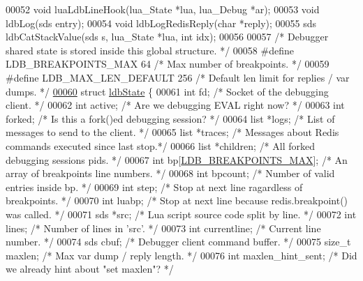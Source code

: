 \begin{DoxyCode}
00052 \textcolor{keywordtype}{void} luaLdbLineHook(lua\_State *lua, lua\_Debug *ar);
00053 \textcolor{keywordtype}{void} ldbLog(sds entry);
00054 \textcolor{keywordtype}{void} ldbLogRedisReply(\textcolor{keywordtype}{char} *reply);
00055 sds ldbCatStackValue(sds s, lua\_State *lua, \textcolor{keywordtype}{int} idx);
00056 
00057 \textcolor{comment}{/* Debugger shared state is stored inside this global structure. */}
00058 \textcolor{preprocessor}{#}\textcolor{preprocessor}{define} \textcolor{preprocessor}{LDB\_BREAKPOINTS\_MAX} 64  \textcolor{comment}{/* Max number of breakpoints. */}
00059 \textcolor{preprocessor}{#}\textcolor{preprocessor}{define} \textcolor{preprocessor}{LDB\_MAX\_LEN\_DEFAULT} 256 \textcolor{comment}{/* Default len limit for replies / var dumps. */}
\hyperlink{structldbState}{00060} \textcolor{keyword}{struct} \hyperlink{structldbState}{ldbState} \{
00061     \textcolor{keywordtype}{int} fd;     \textcolor{comment}{/* Socket of the debugging client. */}
00062     \textcolor{keywordtype}{int} active; \textcolor{comment}{/* Are we debugging EVAL right now? */}
00063     \textcolor{keywordtype}{int} forked; \textcolor{comment}{/* Is this a fork()ed debugging session? */}
00064     list *logs; \textcolor{comment}{/* List of messages to send to the client. */}
00065     list *traces; \textcolor{comment}{/* Messages about Redis commands executed since last stop.*/}
00066     list *children; \textcolor{comment}{/* All forked debugging sessions pids. */}
00067     \textcolor{keywordtype}{int} bp[\hyperlink{scripting_8c_a4f3000cf3b5955f8134bfcd2fa340db3}{LDB\_BREAKPOINTS\_MAX}]; \textcolor{comment}{/* An array of breakpoints line numbers. */}
00068     \textcolor{keywordtype}{int} bpcount; \textcolor{comment}{/* Number of valid entries inside bp. */}
00069     \textcolor{keywordtype}{int} step;   \textcolor{comment}{/* Stop at next line ragardless of breakpoints. */}
00070     \textcolor{keywordtype}{int} luabp;  \textcolor{comment}{/* Stop at next line because redis.breakpoint() was called. */}
00071     sds *src;   \textcolor{comment}{/* Lua script source code split by line. */}
00072     \textcolor{keywordtype}{int} lines;  \textcolor{comment}{/* Number of lines in 'src'. */}
00073     \textcolor{keywordtype}{int} currentline;    \textcolor{comment}{/* Current line number. */}
00074     sds cbuf;   \textcolor{comment}{/* Debugger client command buffer. */}
00075     size\_t maxlen;  \textcolor{comment}{/* Max var dump / reply length. */}
00076     \textcolor{keywordtype}{int} maxlen\_hint\_sent; \textcolor{comment}{/* Did we already hint about "set maxlen"? */}

\end{DoxyCode}
